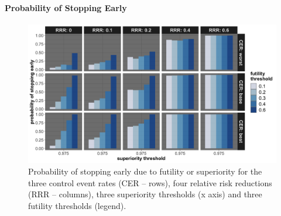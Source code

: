 \documentclass[]{article}
\let\oldparagraph\paragraph
\renewcommand{\paragraph}[1]{\oldparagraph{#1}\mbox{}}
\begin{document}
\hypertarget{probability-of-stopping-early-2}{%
\paragraph{Probability of Stopping
Early}\label{probability-of-stopping-early-2}}

\begin{figure}
  \caption{Probability of stopping early due to futility or superiority for the three control event rates (CER – rows),
  four relative risk reductions (RRR – columns), three superiority thresholds (x axis) and three futility thresholds
  (legend).}
  \includegraphics{../p1_plots/batch_size_nb_3000/prob_stop_early_p1.png}
\end{figure}
\end{document}

